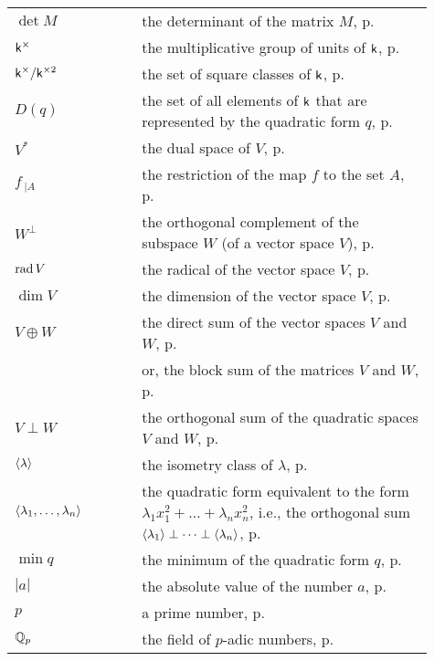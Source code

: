 \begin{longtable}{p{0.25\linewidth} p{0.01\linewidth} p{0.65\linewidth}}
    \(\det M\) && the determinant of the matrix \(M\), p.\,\pageref{sec:quadratic-space-change-of-basis}\\
    \(\mathsf{k}^{\times}\) && the multiplicative group of units of \(\mathsf{k}\), p.\,\pageref{sec:square-classes}\\
    \(\mathsf{k}^{\times}/\mathsf{k}^{\times2}\) && the set of square classes of \(\mathsf{k}\), p.\,\pageref{sec:square-classes}\\
    \(D(q)\) && the set of all elements of \(\mathsf{k}\) that are represented by the quadratic form \(q\), p.\,\pageref{sec:representation}\\ 
    \(V^*\) && the dual space of \(V\), p.\,\pageref{sec:nondegenerate}\\
    \(f\,_{|A}\) && the restriction of the map \(f\) to the set \(A\), p.\,\pageref{sec:orthogonality}\\
    \(W^{\perp}\) && the orthogonal complement of the subspace \(W\) (of a vector space \(V\)), p.\,\pageref{sec:orthogonality}\\
    \(\operatorname{rad} V\) && the radical of the vector space \(V\), p.\,\pageref{sec:orthogonality}\\
    \(\dim V\) && the dimension of the vector space \(V\), p.\,\pageref{sec:orthogonality}\\
    \(V \oplus W\) && the direct sum of the vector spaces \(V\) and \(W\), p.\,\pageref{sec:orthogonal-sum}\\
    && or, the block sum of the matrices \(V\) and \(W\), p.\,\pageref{eq:orthogonal-sum-as-block-sum}\\
    \(V \perp W\) && the orthogonal sum of the quadratic spaces \(V\) and \(W\), p.\,\pageref{sec:orthogonal-sum}\\
    \(\langle \lambda \rangle\) && the isometry class of \(\lambda\), p.\,\pageref{sec:lambda-class}\\
    \(\langle \lambda_1, \dots, \lambda_n \rangle\) && the quadratic form equivalent to the form \(\lambda_1 x_1^2 + \dots + \lambda_n x_n^2\), i.e., the orthogonal sum \(\langle \lambda_1 \rangle \perp \dots \perp \langle \lambda_n \rangle\), p.\,\pageref{sec:lambda-class}\\
    \(\min q\) && the minimum of the quadratic form \(q\), p.\,\pageref{sec:minimum}\\
    \(|a|\) && the absolute value of the number \(a\), p.\,\pageref{sec:minimum}\\
    \(p\) && a prime number, p.\,\pageref{chap:local-global-principle}\\
    \(\mathbb{Q}_p\) && the field of \(p\)-adic numbers, p.\,\pageref{chap:local-global-principle}\\

\end{longtable}
